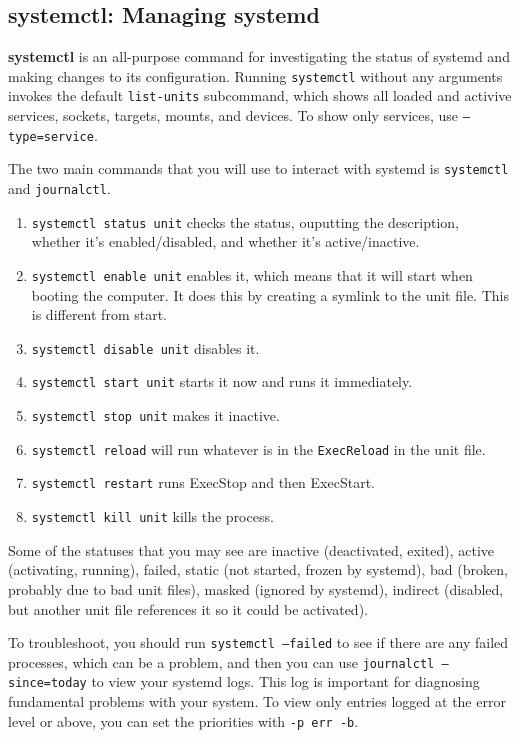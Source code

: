 \documentclass{article}
\begin{document}
  \subsection{systemctl: Managing systemd} 

    \textbf{systemctl} is an all-purpose command for investigating the status of systemd and making changes to its configuration. Running \texttt{systemctl} without any arguments invokes the default \texttt{list-units} subcommand, which shows all loaded and activive services, sockets, targets, mounts, and devices. To show only services, use \texttt{--type=service}. 

    The two main commands that you will use to interact with systemd is \texttt{systemctl} and \texttt{journalctl}. 
    
    \begin{enumerate}
      \item \texttt{systemctl status unit} checks the status, ouputting the description, whether it's enabled/disabled, and whether it's active/inactive. 
      \item \texttt{systemctl enable unit} enables it, which means that it will start when booting the computer. It does this by creating a symlink to the unit file. This is different from start. 
      \item \texttt{systemctl disable unit} disables it. 
      \item \texttt{systemctl start unit} starts it now and runs it immediately. 
      \item \texttt{systemctl stop unit} makes it inactive. 
      \item \texttt{systemctl reload} will run whatever is in the \texttt{ExecReload} in the unit file. 
      \item \texttt{systemctl restart} runs ExecStop and then ExecStart. 
      \item \texttt{systemctl kill unit} kills the process. 
    \end{enumerate}

    Some of the statuses that you may see are inactive (deactivated, exited), active (activating, running), failed, static (not started, frozen by systemd), bad (broken, probably due to bad unit files), masked (ignored by systemd), indirect (disabled, but another unit file references it so it could be activated). 

    To troubleshoot, you should run \texttt{systemctl --failed} to see if there are any failed processes, which can be a problem, and then you can use \texttt{journalctl --since=today} to view your systemd logs. This log is important for diagnosing fundamental problems with your system. To view only entries logged at the error level or above, you can set the priorities with \texttt{-p err -b}. 
\end{document}
